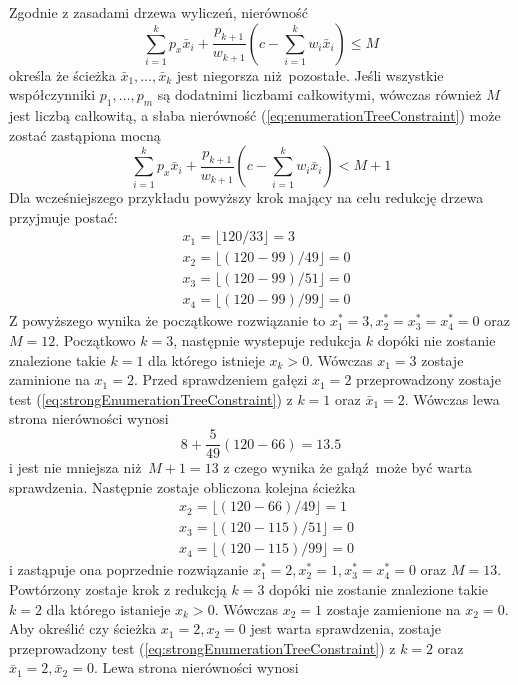 Zgodnie z zasadami drzewa wyliczeń, nierówność
\begin{equation} \label{eq:enumerationTreeConstraint}
  \sum_{i=1}^k p_x\bar{x}_i + \frac{p_{k+1}}{w_{k+1}}(c - \sum_{i=1}^kw_i\bar{x}_i) \le M
\end{equation}
określa że ścieżka $\bar{x}_1, \dots, \bar{x}_k$ jest niegorsza niż pozostałe. Jeśli wszystkie współczynniki $p_1,\dots,p_m$ są dodatnimi liczbami całkowitymi, wówczas również $M$ jest liczbą całkowitą, a słaba nierówność (\ref{eq:enumerationTreeConstraint}) może zostać zastąpiona mocną
\begin{equation} \label{eq:strongEnumerationTreeConstraint}
  \sum_{i=1}^k p_x\bar{x}_i + \frac{p_{k+1}}{w_{k+1}}(c - \sum_{i=1}^kw_i\bar{x}_i) < M + 1
\end{equation}
Dla wcześniejszego przykładu powyższy krok mający na celu redukcję drzewa przyjmuje postać:
\begin{equation*}
  \begin{aligned}
    & x_1 = \lfloor120/33\rfloor = 3 \\
    & x_2 = \lfloor(120-99)/49\rfloor = 0 \\
    & x_3 = \lfloor(120-99)/51\rfloor = 0 \\
    & x_4 = \lfloor(120-99)/99\rfloor = 0
  \end{aligned}
\end{equation*}
Z powyższego wynika że początkowe rozwiązanie to $x_1^* = 3, x_2^*=x_3^*=x_4^*=0$ oraz $M = 12$. Początkowo $k=3$, następnie wystepuje redukcja $k$ dopóki nie zostanie znalezione takie $k=1$ dla którego istnieje $x_k > 0$. Wówczas $x_1=3$ zostaje zaminione na $x_1=2$. Przed sprawdzeniem gałęzi $x_1=2$ przeprowadzony zostaje test (\ref{eq:strongEnumerationTreeConstraint}) z $k=1$ oraz $\bar{x}_1 = 2$.
Wówczas lewa strona nierówności wynosi
\begin{equation*}
  8 + \frac{5}{49}(120-66) = 13.5
\end{equation*}
i jest nie mniejsza niż $M + 1 = 13$ z czego wynika że gałąź może być warta sprawdzenia.
Następnie zostaje obliczona kolejna ścieżka
\begin{equation*}
  \begin{aligned}
    & x_2 = \lfloor(120-66)/49\rfloor = 1 \\
    & x_3 = \lfloor(120-115)/51\rfloor = 0 \\
    & x_4 = \lfloor(120-115)/99\rfloor = 0
  \end{aligned}
\end{equation*}
i zastąpuje ona poprzednie rozwiązanie $x_1^* = 2, x_2^*=1, x_3^*=x_4^*=0$ oraz $M = 13$. Powtórzony zostaje krok z redukcją $k=3$ dopóki nie zostanie znalezione takie $k=2$ dla którego istanieje $x_k>0$. Wówczas $x_2=1$ zostaje zamienione na $x_2=0$. Aby określić czy ścieżka $x_1=2, x_2=0$ jest warta sprawdzenia, zostaje przeprowadzony test (\ref{eq:strongEnumerationTreeConstraint}) z $k=2$ oraz $\bar{x}_1 = 2, \bar{x}_2 = 0$. Lewa strona nierówności wynosi
